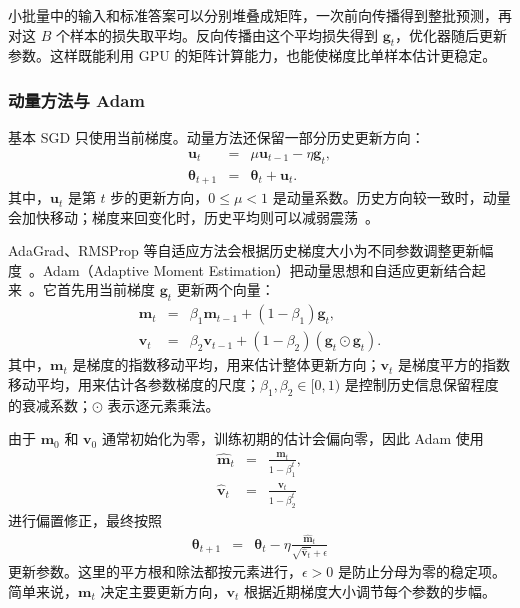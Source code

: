 小批量中的输入和标准答案可以分别堆叠成矩阵，一次前向传播得到整批预测，再对这 $B$ 个样本的损失取平均。反向传播由这个平均损失得到 $\mathbf{g}_t$，优化器随后更新参数。这样既能利用 GPU 的矩阵计算能力，也能使梯度比单样本估计更稳定。

\subsubsection{动量方法与 Adam}

基本 SGD 只使用当前梯度。动量方法还保留一部分历史更新方向：
\begin{eqnarray}
\mathbf{u}_t
& = &
\mu\mathbf{u}_{t-1}-\eta\mathbf{g}_t,\\
\boldsymbol{\theta}_{t+1}
& = &
\boldsymbol{\theta}_t+\mathbf{u}_t.
\end{eqnarray}
其中，$\mathbf{u}_t$ 是第 $t$ 步的更新方向，$0\leq\mu<1$ 是动量系数。历史方向较一致时，动量会加快移动；梯度来回变化时，历史平均则可以减弱震荡~\cite{SutskeverEtAl2013Momentum}。

AdaGrad、RMSProp 等自适应方法会根据历史梯度大小为不同参数调整更新幅度~\cite{duchi-etal:2011adaptive,Hinton:2018RMSProp}。Adam（Adaptive Moment Estimation）把动量思想和自适应更新结合起来~\cite{KingmaBa2015Adam}。它首先用当前梯度 $\mathbf{g}_t$ 更新两个向量：
\begin{eqnarray}
\mathbf{m}_t
& = &
\beta_1\mathbf{m}_{t-1}
+(1-\beta_1)\mathbf{g}_t,\\
\mathbf{v}_t
& = &
\beta_2\mathbf{v}_{t-1}
+(1-\beta_2)
(\mathbf{g}_t\odot\mathbf{g}_t).
\end{eqnarray}
其中，$\mathbf{m}_t$ 是梯度的指数移动平均，用来估计整体更新方向；$\mathbf{v}_t$ 是梯度平方的指数移动平均，用来估计各参数梯度的尺度；$\beta_1,\beta_2\in[0,1)$ 是控制历史信息保留程度的衰减系数；$\odot$ 表示逐元素乘法。

由于 $\mathbf{m}_0$ 和 $\mathbf{v}_0$ 通常初始化为零，训练初期的估计会偏向零，因此 Adam 使用
\begin{eqnarray}
\widehat{\mathbf{m}}_t
& = &
\frac{\mathbf{m}_t}{1-\beta_1^t},\\
\widehat{\mathbf{v}}_t
& = &
\frac{\mathbf{v}_t}{1-\beta_2^t}
\end{eqnarray}
进行偏置修正，最终按照
\begin{eqnarray}
\boldsymbol{\theta}_{t+1}
& = &
\boldsymbol{\theta}_t
-
\eta
\frac{\widehat{\mathbf{m}}_t}
{\sqrt{\widehat{\mathbf{v}}_t}+\epsilon}
\end{eqnarray}
更新参数。这里的平方根和除法都按元素进行，$\epsilon>0$ 是防止分母为零的稳定项。简单来说，$\mathbf{m}_t$ 决定主要更新方向，$\mathbf{v}_t$ 根据近期梯度大小调节每个参数的步幅。

